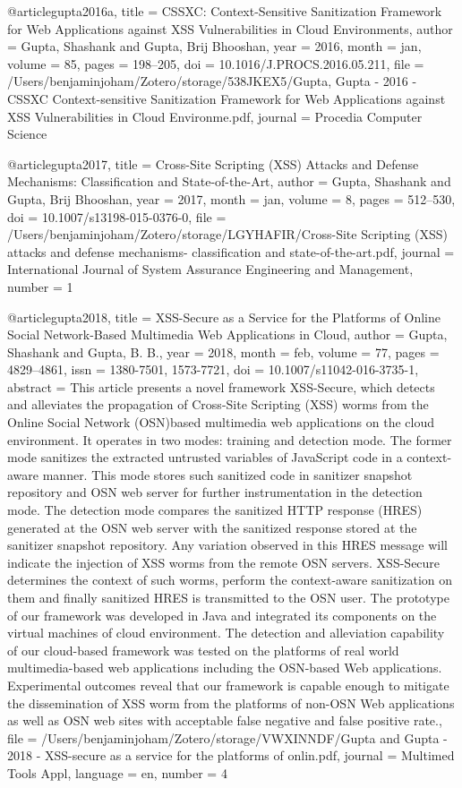 @article{gupta2016a,
  title = {{{CSSXC}}: {{Context}}-Sensitive {{Sanitization Framework}} for {{Web Applications}} against {{XSS Vulnerabilities}} in {{Cloud Environments}}},
  author = {Gupta, Shashank and Gupta, Brij Bhooshan},
  year = {2016},
  month = jan,
  volume = {85},
  pages = {198--205},
  doi = {10.1016/J.PROCS.2016.05.211},
  file = {/Users/benjaminjoham/Zotero/storage/538JKEX5/Gupta, Gupta - 2016 - CSSXC Context-sensitive Sanitization Framework for Web Applications against XSS Vulnerabilities in Cloud Environme.pdf},
  journal = {Procedia Computer Science}
}

@article{gupta2017,
  title = {Cross-{{Site Scripting}} ({{XSS}}) Attacks and Defense Mechanisms: Classification and State-of-the-Art},
  author = {Gupta, Shashank and Gupta, Brij Bhooshan},
  year = {2017},
  month = jan,
  volume = {8},
  pages = {512--530},
  doi = {10.1007/s13198-015-0376-0},
  file = {/Users/benjaminjoham/Zotero/storage/LGYHAFIR/Cross-Site Scripting (XSS) attacks and defense mechanisms- classification and state-of-the-art.pdf},
  journal = {International Journal of System Assurance Engineering and Management},
  number = {1}
}

@article{gupta2018,
  title = {{{XSS}}-Secure as a Service for the Platforms of Online Social Network-Based Multimedia Web Applications in Cloud},
  author = {Gupta, Shashank and Gupta, B. B.},
  year = {2018},
  month = feb,
  volume = {77},
  pages = {4829--4861},
  issn = {1380-7501, 1573-7721},
  doi = {10.1007/s11042-016-3735-1},
  abstract = {This article presents a novel framework XSS-Secure, which detects and alleviates the propagation of Cross-Site Scripting (XSS) worms from the Online Social Network (OSN)based multimedia web applications on the cloud environment. It operates in two modes: training and detection mode. The former mode sanitizes the extracted untrusted variables of JavaScript code in a context-aware manner. This mode stores such sanitized code in sanitizer snapshot repository and OSN web server for further instrumentation in the detection mode. The detection mode compares the sanitized HTTP response (HRES) generated at the OSN web server with the sanitized response stored at the sanitizer snapshot repository. Any variation observed in this HRES message will indicate the injection of XSS worms from the remote OSN servers. XSS-Secure determines the context of such worms, perform the context-aware sanitization on them and finally sanitized HRES is transmitted to the OSN user. The prototype of our framework was developed in Java and integrated its components on the virtual machines of cloud environment. The detection and alleviation capability of our cloud-based framework was tested on the platforms of real world multimedia-based web applications including the OSN-based Web applications. Experimental outcomes reveal that our framework is capable enough to mitigate the dissemination of XSS worm from the platforms of non-OSN Web applications as well as OSN web sites with acceptable false negative and false positive rate.},
  file = {/Users/benjaminjoham/Zotero/storage/VWXINNDF/Gupta and Gupta - 2018 - XSS-secure as a service for the platforms of onlin.pdf},
  journal = {Multimed Tools Appl},
  language = {en},
  number = {4}
}

